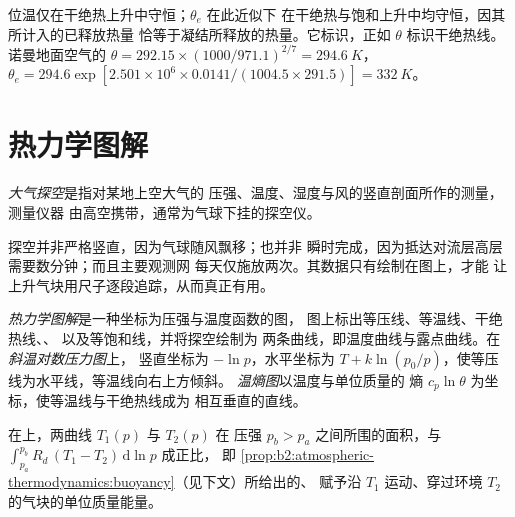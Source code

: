 位温仅在干绝热上升中守恒；$\theta_e$ 在此近似下
在干绝热与饱和上升中均守恒，因其所计入的已释放热量
恰等于凝结所释放的热量。它标识，正如 $\theta$ 标识干绝热线。
诺曼地面空气的 $\theta = 292.15 \times (1000/971.1)^{2/7} = \qty{294.6}{K}$，
$\theta_e = 294.6 \exp[2.501 \times 10^6 \times 0.0141/(1004.5 \times 291.5)] = \qty{332}{K}$。

\section{热力学图解}\label{sec:b2:atmospheric-thermodynamics:diagrams}

\begin{definition}[大气探空]\label{def:b2:atmospheric-thermodynamics:sounding}
\emph{大气探空}是指对某地上空大气的
压强、温度、湿度与风的竖直剖面所作的测量，测量仪器
由高空携带，通常为气球下挂的探空仪。
\end{definition}

探空并非严格竖直，因为气球随风飘移；也并非
瞬时完成，因为抵达对流层高层需要数分钟；而且主要观测网
每天仅施放两次。其数据只有绘制在图上，才能
让上升气块用尺子逐段追踪，从而真正有用。

\begin{definition}\label{def:b2:atmospheric-thermodynamics:diagram}
\emph{热力学图解}是一种坐标为压强与温度函数的图，
图上标出等压线、等温线、干绝热线、、
以及等饱和线，并将探空绘制为
两条曲线，即温度曲线与露点曲线。在\emph{斜温对数压力图}上，
竖直坐标为 $-\ln p$，水平坐标为
$T + k\ln(p_0/p)$，使等压线为水平线，等温线向右上方倾斜。
\emph{温熵图}以温度与单位质量的
熵 $c_p\ln\theta$ 为坐标，使等温线与干绝热线成为
相互垂直的直线。
\end{definition}

\begin{proposition}[面积即能量]\label{prop:b2:atmospheric-thermodynamics:areas}
在上，两曲线 $T_1(p)$ 与 $T_2(p)$ 在
压强 $p_b > p_a$ 之间所围的面积，与 $\int_{p_a}^{p_b} R_d\,(T_1 - T_2)\,\mathrm{d}\ln p$ 成正比，
即 \cref{prop:b2:atmospheric-thermodynamics:buoyancy}（见下文）所给出的、
赋予沿 $T_1$ 运动、穿过环境 $T_2$ 的气块的单位质量能量。
\end{proposition}

